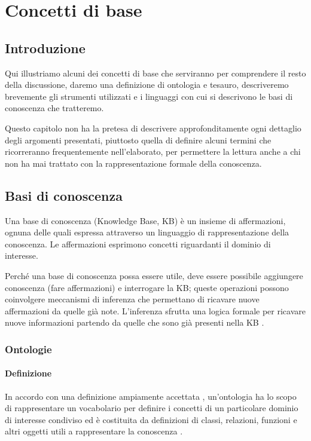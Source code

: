 \chapter{Concetti di base}

\section{Introduzione}
Qui illustriamo alcuni dei concetti di base che serviranno per comprendere il resto della discussione, daremo una definizione di ontologia e tesauro, descriveremo brevemente gli strumenti utilizzati e i linguaggi con cui si descrivono le basi di conoscenza che tratteremo.

Questo capitolo non ha la pretesa di descrivere approfonditamente ogni dettaglio degli argomenti presentati, piuttosto quella di definire alcuni termini che ricorreranno frequentemente nell'elaborato, per permettere la lettura anche a chi non ha mai trattato con la rappresentazione formale della conoscenza.


\section{Basi di conoscenza}
Una base di conoscenza (Knowledge Base, KB) è un insieme di affermazioni, ognuna delle quali espressa attraverso un linguaggio di rappresentazione della conoscenza. Le affermazioni esprimono concetti riguardanti il dominio di interesse.

Perché una base di conoscenza possa essere utile, deve essere possibile aggiungere conoscenza (fare affermazioni) e interrogare la KB; queste operazioni possono coinvolgere meccanismi di inferenza che permettano di ricavare nuove affermazioni da quelle già note. L'inferenza sfrutta una logica formale per ricavare nuove informazioni partendo da quelle che sono già presenti nella KB \cite{russell2010artificial}.
\subsection{Ontologie}
\subsubsection{Definizione}
In accordo con una definizione ampiamente accettata \cite{hitzler2021review}, un'ontologia ha lo scopo di rappresentare un vocabolario per definire i concetti di un particolare dominio di interesse condiviso ed è costituita da definizioni di classi, relazioni, funzioni e altri oggetti utili a rappresentare la conoscenza \cite{gruber1993translation}. 

